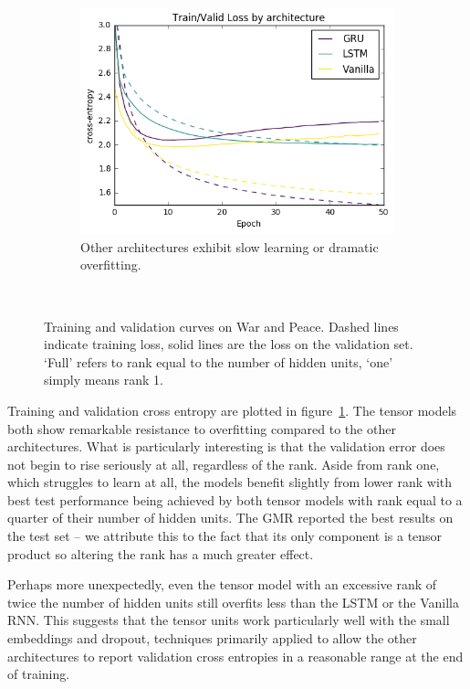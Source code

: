 \begin{figure}[t]
\begin{subfigure}[t]{0.3\textwidth}
	\centering
	\includegraphics[width=\textwidth]{exps/wp/others}
	\caption[War and Peace, other architectures]
	{Other architectures exhibit slow learning or dramatic overfitting.}
\end{subfigure}~
\caption[War and Peace, training curves]
		{Training and validation curves on War and Peace. 
		 Dashed lines indicate training loss, solid lines are the loss on the validation set.
		 `Full' refers to rank equal to the number of hidden units, `one' simply means rank 1.}
\label{fig:wp}
\end{figure}

Training and validation cross entropy are plotted in figure~\ref{fig:wp}. 
The tensor models both
show remarkable resistance to overfitting compared to the other architectures. What is particularly
interesting is that the validation error does not begin to rise seriously at all, regardless of the
rank. Aside from rank one, which struggles to learn at all, the models benefit slightly from lower
rank with best test performance being achieved by both tensor models with rank equal to a quarter
of their number of hidden units. The GMR reported the best results on the test set -- we
attribute this to the fact that its only component is a tensor product so altering the rank has
a much greater effect.

Perhaps more unexpectedly, even the tensor model with an excessive rank of twice the number of hidden
units still overfits less than the LSTM or the Vanilla RNN. This suggests that
the tensor units work particularly well with the small embeddings and dropout, techniques primarily
applied to allow the other architectures to report validation cross entropies in a reasonable range
at the end of training.

